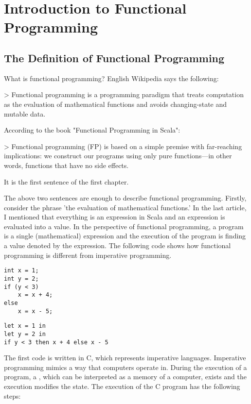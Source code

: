 \setchapterpreamble[u]{\margintoc}
\chapter{Introduction to Functional Programming}

\section{The Definition of Functional Programming}

What is functional programming? English Wikipedia says the following:

> Functional programming is a programming paradigm that treats computation as the
evaluation of mathematical functions and avoids changing-state and mutable data.

According to the book "Functional Programming in Scala":

> Functional programming (FP) is based on a simple premise with far-reaching
implications: we construct our programs using only pure functions—in other words,
functions that have no side effects.

It is the first sentence of the first chapter.

The above two sentences are enough to describe functional programming. Firstly,
consider the phrase 'the evaluation of mathematical functions.' In the last
article, I mentioned that everything is an expression in Scala and an expression
is evaluated into a value. In the perspective of functional programming, a
program is a single (mathematical) expression and the execution of the program is
finding a value denoted by the expression. The following code shows how
functional programming is different from imperative programming.

\begin{verbatim}
int x = 1;
int y = 2;
if (y < 3)
    x = x + 4;
else
    x = x - 5;
\end{verbatim}

\begin{verbatim}
let x = 1 in
let y = 2 in
if y < 3 then x + 4 else x - 5
\end{verbatim}

The first code is written in C, which represents imperative languages. Imperative
programming mimics a way that computers operate in. During the execution of a
program, a , which can be interpreted as a memory of a computer,
exists and the execution modifies the state. The execution of the C program has
the following steps:

